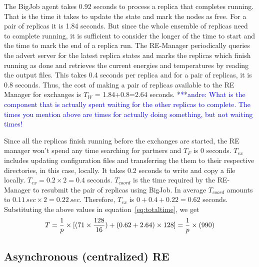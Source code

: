 \documentclass{rspublic}
\newcommand{\alnote}[1]{ {\textcolor{blue} { ***andre: #1 }}}
\newcommand{\alnote}[1]{}
\begin{document}
The BigJob agent takes 0.92 seconds to process a replica that
completes running.  That is the time it takes to update the state and
mark the nodes as free. For a pair of replicas it is 1.84 seconds. But
since the whole ensemble of replicas need to complete running, it is
sufficient to consider the longer of the time to start and the time to
mark the end of a replica run.  The RE-Manager periodically queries
the advert server for the latest replica states and marks the replicas
which finish running as done and retrieves the current energies and
temperatures by reading the output files. This takes 0.4 seconds per
replica and for a pair of replicas, it is 0.8 seconds.  Thus, the cost
of making a pair of replicas available to the RE Manager for exchanges
is $T_W$ = 1.84+0.8=2.64 seconds.  \alnote{What is the component that
  is actually spent waiting for the other replicas to complete. The
  times you mention above are times for actually doing something, but
  not waiting times!}

Since all the replicas finish running before the exchanges are
started, the RE manager won't spend any time searching for partners
and $T_F$ is 0 seconds. $T_{ex}$ includes updating configuration files
and transferring the them to their respective directories, in this
case, locally. It takes 0.2 seconds to write and copy a file
locally. $T_{ex} = 0.2 \times 2=0.4$ seconds. $T_{coord}$ is the time
required by the RE-Manager to resubmit the pair of replicas using
BigJob. In average $T_{coord}$ amounts to $0.11\,sec \times 2 =
0.22\,sec$. Therefore, $T_{ex}$ is $0+0.4+0.22=0.62$ seconds.
Substituting the above values in equation~\ref{eq:totaltime}, we get
\begin{eqnarray}
  T=  {1 \over p} \times {[ {(71\times {128\over 16}})+ (0.62 + 2.64)\times 128]} = {1 \over p} \times (990)
\label{eq:sync}
\end{eqnarray}


\subsection{Asynchronous (centralized) RE}

\end{document}

